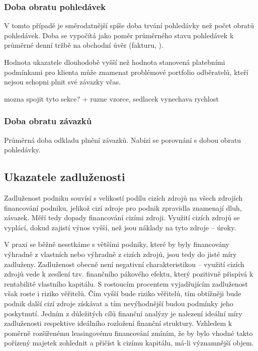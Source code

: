 \subsubsection{Doba obratu pohledávek}
V tomto případě je směrodatnější spíše doba trvání pohledávky než počet obratů pohledávek. Doba se vypočítá jako poměr průměrného stavu pohledávek k průměrné denní tržbě na obchodní úvěr (fakturu, ).

Hodnota ukazatele dlouhodobě vyšší než hodnota stanovená platebními podmínkami pro klienta může znamenat problémové portfolio odběratelů, kteří nejsou schopni plnit své závazky včas.

mozna spojit tyto sekce? + ruzne vzorce, sedlacek vynechava rychlost

\subsubsection{Doba obratu závazků}
Průměrná doba odkladu plnění závazků. Nabízí se porovnání s dobou obratu pohledávky. 





\subsection{Ukazatele zadluženosti}

Zadluženost podniku souvísí s velikostí podílu cizích zdrojů na všech zdrojích financování podniku, jelikož cizí zdroje pro podnik zpravidla znamenají dluh, závazek. Měří tedy dopady financování cizími zdroji. Využití cizích zdrojů se vyplácí, dokud zajistí výnos vyšší, než jsou náklady na tyto zdroje -- úroky.

V praxi se běžně nesetkáme s většími podniky, které by byly financovány výhradně z vlastních nebo výhradně z cizích zdrojů, jsou tedy do jisté míry zadluženy. Zadluženost obecně není negativní charakteristikou -- využití cizích zdrojů vede k zesílení tzv. finančního pákového efektu, který pozitivně přispívá k rentabilitě vlastního kapitálu\cite{kisling}. S rostoucím procentem vyjadřujícím zadluženost však roste i riziko věřitelů. Čím vyšší bude riziko věřitelů, tím obtížněji bude podnik další cizí zdroje získávat a tím nevýhodnější budou podmínky jeho poskytnutí\cite{mendelu}. Jedním z důležitých cílů finanční analýzy je nalezení ideální míry zadluženosti respektive ideálního rozložení finanční struktury. Vzhledem k poměrně rozšířenému leasingovému financování zmíním, že by bylo vhodné takto pořízený majetek zohlednit a přičíst k cizímu kapitálu, má-li významnější objem.

